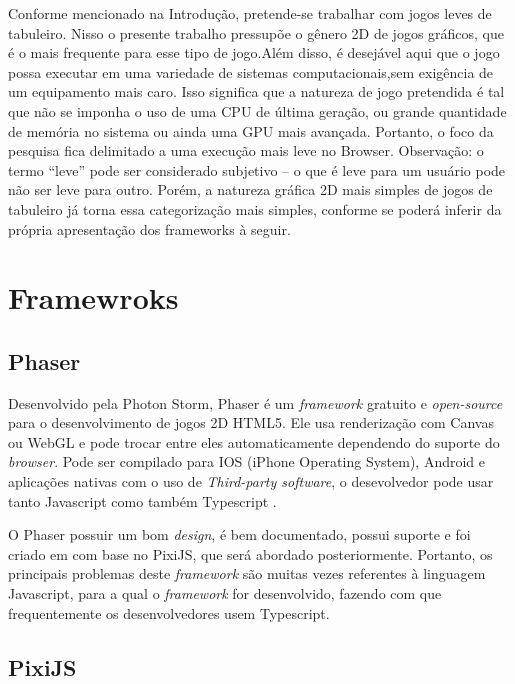 Conforme mencionado na Introdução, pretende-se trabalhar com jogos leves de tabuleiro. Nisso o presente trabalho pressupõe o gênero 2D de jogos gráficos, que é o mais frequente para esse tipo de jogo.Além disso, é desejável aqui que o jogo possa executar em uma variedade de sistemas computacionais,sem exigência de um equipamento mais caro. Isso significa que a natureza de jogo pretendida é tal que não se imponha o uso de uma CPU de última geração, ou grande quantidade de memória no sistema ou ainda uma GPU mais avançada. Portanto, o foco da pesquisa fica delimitado a uma execução mais leve no Browser. Observação: o termo “leve” pode ser considerado subjetivo – o que é leve para um usuário pode não ser leve para outro. Porém, a natureza gráfica 2D mais simples de jogos de tabuleiro já torna essa categorização mais simples, conforme se poderá inferir da própria apresentação dos frameworks à seguir.

\section{Framewroks}

\subsection{ Phaser }

Desenvolvido pela Photon Storm, Phaser é um
\textit{framework} gratuito e \textit{
open-source } para o desenvolvimento de jogos 2D
HTML5. Ele usa renderização com Canvas ou WebGL e
pode trocar entre eles automaticamente dependendo
do suporte do  \textit{browser}. Pode ser
compilado para IOS (iPhone Operating System),
Android e aplicações nativas com o uso de
\textit{Third-party software}, o desevolvedor
pode usar tanto Javascript como também Typescript
\cite{faas2017introduction}. 

O Phaser possuir um bom \textit{design}, é bem documentado, possui suporte e foi criado em com base no PixiJS, que será abordado posteriormente. Portanto, os principais problemas deste \textit{framework} são muitas vezes referentes à linguagem Javascript, para a qual o \textit{framework} for desenvolvido, fazendo com que frequentemente os desenvolvedores usem Typescript.

\subsection{ PixiJS }


